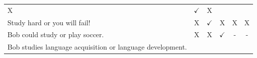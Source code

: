 \documentclass[oneside]{report}
\theoremstyle{definition}
\theoremstyle{definition}
\theoremstyle{definition}
\theoremstyle{remark}
\begin{document}
\begin{longtable}[]{@{}lccccc@{}}
\begin{minipage}[t]{0.05\columnwidth}
X\strut
\end{minipage} & \begin{minipage}[t]{0.09\columnwidth}\centering\strut
\(\checkmark\)\strut
\end{minipage} & \begin{minipage}[t]{0.12\columnwidth}\centering\strut
X\strut
\end{minipage}\tabularnewline
\begin{minipage}[t]{0.47\columnwidth}\raggedright\strut
Study hard or you will fail!\strut
\end{minipage} & \begin{minipage}[t]{0.05\columnwidth}\centering\strut
X\strut
\end{minipage} & \begin{minipage}[t]{0.05\columnwidth}\centering\strut
\(\checkmark\)\strut
\end{minipage} & \begin{minipage}[t]{0.05\columnwidth}\centering\strut
X\strut
\end{minipage} & \begin{minipage}[t]{0.09\columnwidth}\centering\strut
X\strut
\end{minipage} & \begin{minipage}[t]{0.12\columnwidth}\centering\strut
X\strut
\end{minipage}\tabularnewline
\begin{minipage}[t]{0.47\columnwidth}\raggedright\strut
Bob could study or play soccer.\strut
\end{minipage} & \begin{minipage}[t]{0.05\columnwidth}\centering\strut
X\strut
\end{minipage} & \begin{minipage}[t]{0.05\columnwidth}\centering\strut
X\strut
\end{minipage} & \begin{minipage}[t]{0.05\columnwidth}\centering\strut
\(\checkmark\)\strut
\end{minipage} & \begin{minipage}[t]{0.09\columnwidth}\centering\strut
-\strut
\end{minipage} & \begin{minipage}[t]{0.12\columnwidth}\centering\strut
-\strut
\end{minipage}\tabularnewline
\begin{minipage}[t]{0.47\columnwidth}\raggedright\strut
Bob studies language acquisition or language development.\strut
\end{minipage} & \begin{minipage}[t]{0.05\columnwidth}\centering\strut

\end{minipage}
\end{longtable}
\end{document}
